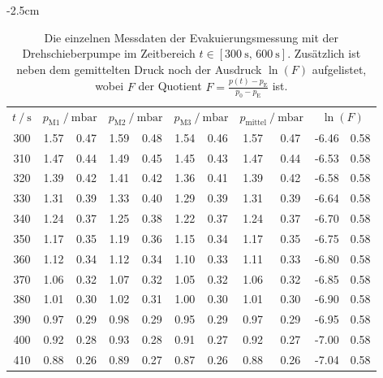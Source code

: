  \begin{table}[h]
    \centering
    \caption{Die einzelnen Messdaten der Evakuierungsmessung mit der Drehschieberpumpe im Zeitbereich $t \in [\SI{300}{\second}, \, \SI{600}{\second}]$. Zusätzlich ist neben dem gemittelten Druck noch der Ausdruck $\ln(F)$ aufgelistet, wobei $F$ der Quotient $F = \frac{p(t) - p_\text{E}}{p_0 - p_\text{E}}$ ist. }
    \label{tab:dreh_eva2}
    \begin{center}
      \addtolength{\leftskip} {-2.5cm} %
      \addtolength{\rightskip}{-2.5cm}
    \begin{tabular*}{1.2\textwidth}{@{\extracolsep{\fill}} S[table-format=3.0] S @{${}\pm{}$} S S @{${}\pm{}$} S S @{${}\pm{}$} S S @{${}\pm{}$} S S[table-format=2.2] @{${}\pm{}$} S}
      \toprule
      {$t \mathbin{/} \si{\second}$} &  &  &  &  &  \\
      300 & 1.57 & 0.47 & 1.59 & 0.48 & 1.54 & 0.46 & 1.57 & 0.47 & -6.46 & 0.58 \\
      310 & 1.47 & 0.44 & 1.49 & 0.45 & 1.45 & 0.43 & 1.47 & 0.44 & -6.53 & 0.58 \\ 
      320 & 1.39 & 0.42 & 1.41 & 0.42 & 1.36 & 0.41 & 1.39 & 0.42 & -6.58 & 0.58 \\
      330 & 1.31 & 0.39 & 1.33 & 0.40 & 1.29 & 0.39 & 1.31 & 0.39 & -6.64 & 0.58 \\
      340 & 1.24 & 0.37 & 1.25 & 0.38 & 1.22 & 0.37 & 1.24 & 0.37 & -6.70 & 0.58 \\
      350 & 1.17 & 0.35 & 1.19 & 0.36 & 1.15 & 0.34 & 1.17 & 0.35 & -6.75 & 0.58 \\
      360 & 1.12 & 0.34 & 1.12 & 0.34 & 1.10 & 0.33 & 1.11 & 0.33 & -6.80 & 0.58 \\
      370 & 1.06 & 0.32 & 1.07 & 0.32 & 1.05 & 0.32 & 1.06 & 0.32 & -6.85 & 0.58 \\
      380 & 1.01 & 0.30 & 1.02 & 0.31 & 1.00 & 0.30 & 1.01 & 0.30 & -6.90 & 0.58 \\
      390 & 0.97 & 0.29 & 0.98 & 0.29 & 0.95 & 0.29 & 0.97 & 0.29 & -6.95 & 0.58 \\
      400 & 0.92 & 0.28 & 0.93 & 0.28 & 0.91 & 0.27 & 0.92 & 0.27 & -7.00 & 0.58 \\
      410 & 0.88 & 0.26 & 0.89 & 0.27 & 0.87 & 0.26 & 0.88 & 0.26 & -7.04 & 0.58 \\

\end{tabular*}
\end{center}
\end{table}
